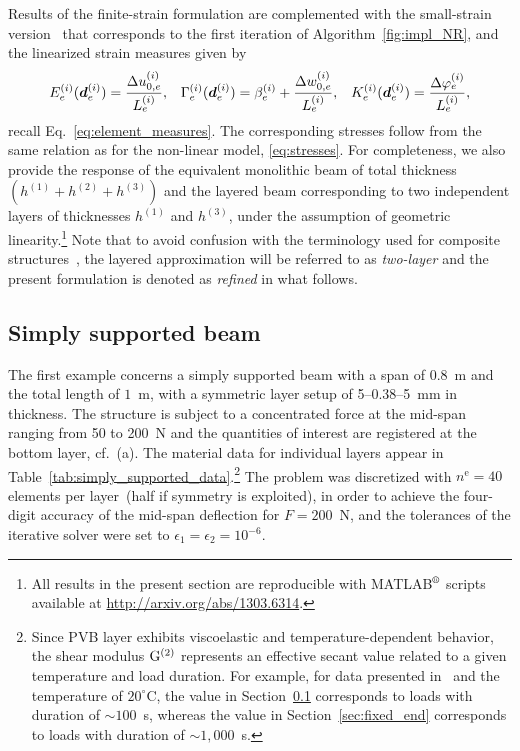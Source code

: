 \documentclass[11pt]{article}
\newcommand{\rev}[1]{#1}
\newcommand{\Eref}[1]{Eq.~\eqref{#1}}
\newcommand{\M}[1]{{\boldsymbol #1}}
\newcommand{\lay}[1]{^{(#1)}}
\newcommand{\rot}[1]{\varphi\lay{#1}}
\newcommand{\Drot}[2]{\Delta\rot{#1}_#2}
\newcommand{\h}[1]{h\lay{#1}}
\newcommand{\Duc}[2]{\Delta u_{0,#2}\lay{#1}}
\newcommand{\Dwc}[2]{\Delta w_{0,#2}\lay{#1}}
\newcommand{\Sc}[1]{E\lay{#1}}
\newcommand{\Kc}[1]{K\lay{#1}}
\newcommand{\Gc}[1]{\Gamma\lay{#1}}
\newcommand{\Mde}[2]{\Md^{(#1)}_{#2}}
\newcommand{\el}{e}
\newcommand{\numel}{n^\mathrm{\el}}
\newcommand{\Md}{\M{d}}
\newcommand{\Sref}[1]{Section~\ref{#1}}
\newcommand{\Tref}[1]{Table~\ref{#1}}
\newcommand{\Alref}[1]{Algorithm~\ref{#1}}
\begin{document}
Results of the finite-strain formulation are complemented with the small-strain
version~\cite{Zemanova:2008:SNM} that corresponds to the first iteration of
\Alref{fig:impl_NR}\rev{, and the linearized strain measures given by
\begin{align*}
\Sc{i}_\el(\Mde{i}{\el})
= 
\frac{\Duc{i}{\el}}{\eL{\el}{i}}
, &&
\Gc{i}_\el(\Mde{i}{\el}) 
= 
\beta\lay{i}_\el
+
\frac{\Dwc{i}{\el}}{\eL{\el}{i}}
, &&
\Kc{i}_\el(\Mde{i}{\el}) 
= 
\frac{\Drot{i}{\el}}{\eL{\el}{i}},
\end{align*}
recall \Eref{eq:element_measures}. The corresponding stresses follow from the
same relation as for the non-linear model, \eqref{eq:stresses}.} For
completeness, we also provide the response of the equivalent monolithic beam of
total thickness $(\h{1} + \h{2} + \h{3})$ and the layered beam corresponding to
two independent layers of thicknesses $\h{1}$ and $\h{3}$, \rev{under the
assumption of geometric linearity}.\footnote{All results in the present section
are reproducible with MATLAB$^\text{\textregistered}$ scripts available at
\url{http://arxiv.org/abs/1303.6314}.} Note that to avoid confusion with the
terminology used for composite structures~\cite{Mau:1973:RLP}, the layered
approximation will \rev{be} referred to as \emph{two-layer} and the present
formulation is denoted as \emph{refined} in what follows.

\subsection{Simply supported beam}\label{sec:simply_supported}

The first example concerns a simply supported beam with a span of $0.8$~m and
the total length of $1$~m, with a symmetric layer setup of 5--0.38--5~mm in
thickness. The structure is subject to a concentrated force at the mid-span
ranging from 50 to 200~N and the quantities of interest are registered at the
bottom layer, cf.~(a). The material data for
individual layers appear in
\Tref{tab:simply_supported_data}.\footnote{\rev{Since PVB layer exhibits
viscoelastic and temperature-dependent behavior, the shear modulus $\G{2}$
represents an effective secant value related to a given temperature and load
duration. For example, for data presented in~\cite{Foraboschi:2007:BFS} and the
temperature of $20^\circ$C, the value in \Sref{sec:simply_supported} corresponds
to loads with duration of $\sim 100$~s, whereas the value in
\Sref{sec:fixed_end} corresponds to loads with duration of $\sim
1,000$~s.\label{footnote}}} The problem was discretized with $\numel = 40$
elements per layer~(half if symmetry is exploited), in order to achieve the
four-digit accuracy of the mid-span deflection for $F = 200$~N, and the
tolerances of the iterative solver were set to $\epsilon_1 = \epsilon_2 =
10^{-6}$.
\end{document}

